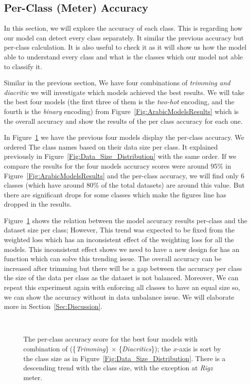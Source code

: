 \subsection{Per-Class (Meter) Accuracy}

In this section, we will explore the accuracy of each class. This is regarding how our model can detect every class separately. It similar the previous accuracy but per-class calculation. It is also useful to check it as it will show us how the model able to understand every class and what is the classes which our model not able to classify it. 

Similar in the previous section, We have four combinations of \textit{trimming and diacritic} we will investigate which models achieved the best results. We will take the best four models (the first three of them is the \textit{two-hot} encoding, and the fourth is the \textit{binary} encoding) from Figure~\ref{Fig:ArabicModelsResults} which is the overall accuracy and show the results of the per class accuracy for each one.

In Figure~\ref{Fig:Results_Per_Class} we have the previous four models display the per-class accuracy. We ordered The class names based on their data size per class. It explained previously in Figure~\ref{Fig:Data_Size_Distribution} with the same order. If we compare the results for the four models accuracy scores were around 95\% in Figure~\ref{Fig:ArabicModelsResults} and the per-class accuracy, we will find only 6 classes (which have around 80\% of the total datasets) are around this value. But there are significant drops for some classes which make the figures line has dropped in the results.

Figure~\ref{Fig:Results_Per_Class} shows the relation between the model accuracy results per-class and the dataset size per class; However, This trend was expected to be fixed from the weighted loss which has an inconsistent effect of the weighting loss for all the models. This inconsistent effect shows we need to have a new design for has an function which can solve this trending issue. The overall accuracy can be increased after trimming but there will be a gap between the accuracy per class the size of the data per class as the dataset is not balanced. Moreover, We can repeat this experiment again with enforcing all classes to have an equal size so, we can show the accuracy without in data unbalance issue. We will elaborate more in Section~\ref{Sec:Discussion}.

\begin{figure}[!t]
 
 \caption{The per-class accuracy score for the best four models with combination of (\{\textit{Trimming}\} $\times$ \{\textit{Diacritics}\}); the $x$-axis is sort by the class size as in Figure~\ref{Fig:Data_Size_Distribution}. There is a descending trend with the class size, with the exception at \textit{Rigz} meter.}~\label{Fig:Results_Per_Class}
\end{figure}

